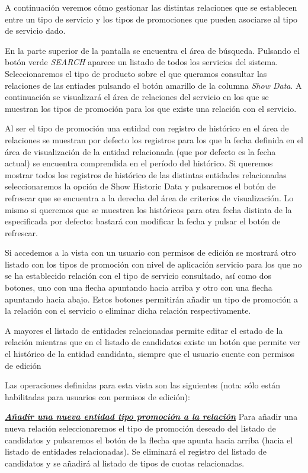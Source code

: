 A continuación veremos cómo gestionar las distintas relaciones que se establecen entre un tipo de servicio y los tipos de promociones que pueden asociarse al tipo de servicio dado.


En la parte superior de la pantalla se encuentra el área de búsqueda. Pulsando el botón verde \emph{SEARCH} aparece un listado de todos los servicios del sistema. Seleccionaremos el tipo de producto sobre el que queramos consultar las relaciones de las entiades pulsando el botón amarillo de la columna \emph{Show Data}. A continuación se visualizará el área de relaciones del servicio en los que se muestran los tipos de promoción para los que existe una relación con el servicio.

Al ser el tipo de promoción una entidad con registro de histórico en el área de relaciones se muestran por defecto los registros para los que la fecha definida en el área de visualización de la entidad relacionada (que por defecto es la fecha actual) se encuentra comprendida en el período del histórico. Si queremos mostrar todos los registros de histórico de las distintas entidades relacionadas seleccionaremos la opción de Show Historic Data y pulsaremos el botón de refrescar que se encuentra a la derecha del área de criterios de visualización. Lo mismo si queremos que se muestren los históricos para otra fecha distinta de la especificada por defecto: bastará con modificar la fecha y pulsar el botón de refrescar.

Si accedemos a la vista con un usuario con permisos de edición se mostrará otro listado con los tipos de promoción con nivel de aplicación servicio para los que no se ha establecido relación con el tipo de servicio consultado, así como dos botones, uno con una flecha apuntando hacia arriba y otro con una flecha apuntando hacia abajo. Estos botones permitirán añadir un tipo de promoción a la relación con el servicio o eliminar dicha relación respectivamente. 

A mayores el listado de entidades relacionadas permite editar el estado de la relación mientras que en el listado de candidatos existe un botón que permite ver el histórico de la entidad candidata, siempre que el usuario cuente con permisos de edición


Las operaciones definidas para esta vista son las siguientes (nota: sólo están habilitadas para usuarios con permisos de edición):

\underline{\textsl{\textbf{Añadir una nueva entidad tipo promoción a la relación}}} \newline
Para añadir una nueva relación seleccionaremos el tipo de promoción deseado del listado de candidatos y pulsaremos el botón de la flecha que apunta hacia arriba (hacia el listado de entidades relacionadas). Se eliminará el registro del listado de candidatos y se añadirá al listado de tipos de cuotas relacionadas.


